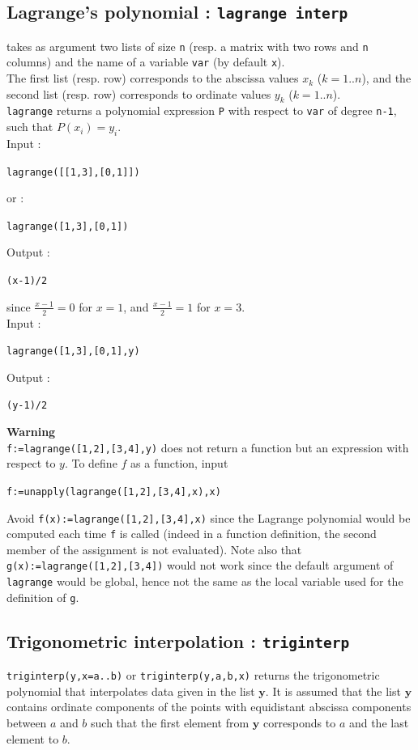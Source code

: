 \documentclass[a4paper,11pt]{book}
\begin{document}
\subsection{Lagrange's polynomial  : {\tt lagrange interp}}
 takes as argument two lists of size {\tt n} (resp. a 
matrix with two rows and  {\tt n} columns) and the name of a  variable 
{\tt var} (by default {\tt x}).\\
The first list (resp. row) corresponds to the abscissa values $x_k$ ($k=1..n$), 
and the second list (resp. row) corresponds to ordinate values $y_k$ 
($k=1..n$).\\
{\tt lagrange} returns a polynomial expression {\tt P} 
with respect to {\tt var} of degree 
{\tt n-1}, such that $P(x_i)=y_i$.\\
Input :
\begin{center}{\tt lagrange([[1,3],[0,1]])}\end{center}
or :
\begin{center}{\tt lagrange([1,3],[0,1])}\end{center}
Output :
\begin{center}{\tt (x-1)/2}\end{center}
since $\frac{x-1}{2}=0$ for $x=1$,  and  $\frac{x-1}{2}=1$ for $x=3$.\\ 
Input :
\begin{center}{\tt lagrange([1,3],[0,1],y)}\end{center}
Output :
\begin{center}{\tt (y-1)/2}\end{center}
{\bf Warning}\\
{\tt f:=lagrange([1,2],[3,4],y)} does not return a function 
but an expression with respect to $y$.
To define $f$ as a function, input
\begin{center}
{\tt f:=unapply(lagrange([1,2],[3,4],x),x)}
\end{center}
Avoid {\tt f(x):=lagrange([1,2],[3,4],x)} since
the Lagrange polynomial would be computed each time {\tt f} is called
(indeed in a function definition, the second member of the assignment
is not evaluated).
Note also that \\
{\tt g(x):=lagrange([1,2],[3,4])} would not work
since the default argument of {\tt lagrange}
would be global, hence not the same as the local
variable used for the definition of {\tt g}.

\subsection{Trigonometric interpolation : {\tt triginterp}}
{\tt triginterp(y,x=a..b)} or {\tt triginterp(y,a,b,x)} returns the trigonometric polynomial that interpolates data given in the list $ \textbf{y} $. It is assumed that the list $ \textbf{y} $ contains ordinate components of the points with equidistant abscissa components between $ a $ and $ b $ such that the first element from $ \textbf{y} $ corresponds to $ a $ and the last element to $ b $.
\end{document}

